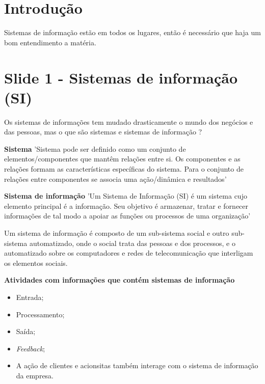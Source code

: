 \documentclass[
	12pt,				%
	openany,			%
	a4paper,			%
	chapter=TITLE,		%
	section=TITLE,		%
	english,
	brazil				%
]{abntex2}
\begin{document}
\imprimircapa

\imprimirfolhaderosto

\tableofcontents

\maketitle

\newpage

\chapter{Introdução}

Sistemas de informação estão em todos os lugares, então é necessário que haja um bom entendimento a matéria.

\chapter{Slide 1 - Sistemas de informação (SI)}



Os sistemas de informações tem mudado drasticamente o mundo dos negócios e das pessoas, mas o que são sistemas e sistemas de informação ? 

\textbf{Sistema}
	'Sistema pode ser definido como um conjunto de elementos/componentes que mantêm relações entre si. Os componentes e as relações formam as características específicas do sistema. Para o conjunto de relações entre componentes se associa uma ação/dinâmica e resultados'

\textbf{Sistema de informação}
	'Um Sistema de Informação (SI) é um sistema cujo elemento principal é a informação. Seu objetivo é armazenar, tratar e fornecer informações de tal modo a apoiar as funções ou processos de uma organização'

Um sistema de informação é composto de um sub-sistema social e outro sub-sistema automatizado, onde o social trata das pessoas e dos processos, e o automatizado sobre os computadores e redes de telecomunicação que interligam os elementos sociais.

\textbf{Atividades com informações que contém sistemas de informação}
	\begin{itemize}
		\item Entrada;
		\item Processamento;
		\item Saída;
		\item \textit{Feedback};
		\item A ação de clientes e acionsitas também interage com o sistema de informação da empresa.
	\end{itemize}
\end{document}
